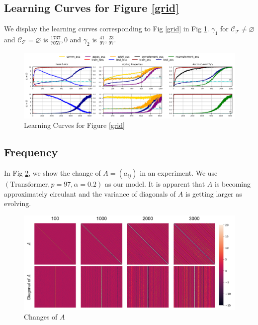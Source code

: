 \documentclass{article}
\begin{document}
\subsection{Learning Curves for Figure \ref{grid}}
\label{appendix-grid}

We display the learning curves corresponding to Fig \ref{grid} in Fig \ref{gridacc}. $\gamma_1$ for $\mathcal{C_T} \neq \varnothing$ and $\mathcal{C_T} = \varnothing$ is $\frac{1737}{7057}, 0$ and $\gamma_2$ is $\frac{41}{97}, \frac{23}{97}$.

\begin{figure}[htbp]
  \centering
  \includegraphics[width=\textwidth]{./pic/grid_acc.png}
  \caption{Learning Curves for Figure \ref{grid}}
  \label{gridacc}
\end{figure}

\subsection{Frequency}
\label{appendix-circulant}

In Fig \ref{aij}, we show the change of $A = (a_{ij})$ in an experiment. We use $(\text{Transformer}, p=97,\alpha=0.2)$ as our model. It is apparent that $A$ is becoming approximately circulant and the variance of diagonals of $A$ is getting larger as evolving.

\begin{figure}[htbp]
  \centering
  \includegraphics[width=.8\textwidth]{./pic/aij.png}
  \caption{Changes of $A$}
  \label{aij}
\end{figure}
\end{document}
